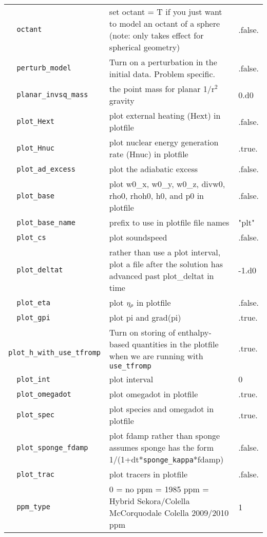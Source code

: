 {\begin{center}
\begin{longtable}{|l|p{3.25in}|l|}
\verb=  octant  = &   set octant = T if you just want to model an octant of a sphere (note: only takes effect for spherical geometry)  &  .false. \\
\verb=  perturb_model  = &   Turn on a perturbation in the initial data.  Problem specific.  &  .false. \\
\verb=  planar_invsq_mass  = &   the point mass for planar 1/r$^2$ gravity  &  0.d0 \\
\verb=  plot_Hext  = &   plot external heating (Hext) in plotfile  &  .false. \\
\verb=  plot_Hnuc  = &   plot nuclear energy generation rate (Hnuc) in plotfile  &  .true. \\
\verb=  plot_ad_excess  = &   plot the adiabatic excess  &  .false. \\
\verb=  plot_base  = &   plot w0\_x, w0\_y, w0\_z, divw0, rho0, rhoh0, h0, and p0 in plotfile  &  .false. \\
\verb=  plot_base_name  = &   prefix to use in plotfile file names  &  "plt" \\
\verb=  plot_cs  = &   plot soundspeed  &  .false. \\
\verb=  plot_deltat  = &   rather than use a plot interval, plot a file after the solution has advanced past plot\_deltat in time  &  -1.d0 \\
\verb=  plot_eta  = &   plot $\eta_{\rho}$ in plotfile  &  .false. \\
\verb=  plot_gpi  = &   plot pi and grad(pi)  &  .true. \\
\verb=  plot_h_with_use_tfromp  = &   Turn on storing of enthalpy-based quantities in the plotfile when we are running with {\tt use\_tfromp}  &  .true. \\
\verb=  plot_int  = &   plot interval  &  0 \\
\verb=  plot_omegadot  = &   plot omegadot in plotfile  &  .true. \\
\verb=  plot_spec  = &   plot species and omegadot in plotfile  &  .true. \\
\verb=  plot_sponge_fdamp  = &   plot fdamp rather than sponge assumes sponge has the form 1/(1+dt*{\tt sponge\_kappa}*fdamp)  &  .false. \\
\verb=  plot_trac  = &   plot tracers in plotfile  &  .false. \\
\verb=  ppm_type  = &   0 = no ppm \newline 1 = 1985 ppm \newline 2 = Hybrid Sekora/Colella McCorquodale Colella 2009/2010 ppm  &  1 \\

\end{longtable}
\end{center}}

